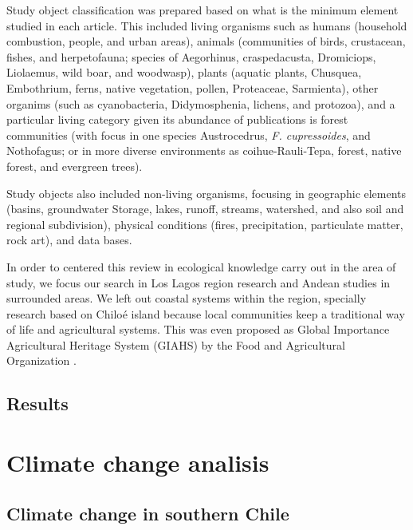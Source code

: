\documentclass[]{article}
\begin{document}
Study object classification was prepared based on what is the minimum element studied in each article. This included living organisms such as humans (household combustion, people, and urban areas), animals (communities of birds, crustacean, fishes, and herpetofauna; species of Aegorhinus, craspedacusta, Dromiciops, Liolaemus, wild boar, and woodwasp), plants (aquatic plants, Chusquea, Embothrium, ferns, native vegetation, pollen, Proteaceae, Sarmienta), other organims (such as cyanobacteria, Didymosphenia, lichens, and protozoa), and a particular living category given its abundance of publications is forest communities (with focus in one species Austrocedrus, \emph{F. cupressoides}, and Nothofagus; or in more diverse environments as coihue-Rauli-Tepa, forest, native forest, and evergreen trees).

Study objects also included non-living organisms, focusing in geographic elements (basins, groundwater Storage, lakes, runoff, streams, watershed, and also soil and regional subdivision), physical conditions (fires, precipitation, particulate matter, rock art), and data bases.

In order to centered this review in ecological knowledge carry out in the area of study, we focus our search in Los Lagos region research and Andean studies in surrounded areas. We left out coastal systems within the region, specially research based on Chiloé island because local communities keep a traditional way of life and agricultural systems. This was even proposed as Global Importance Agricultural Heritage System (GIAHS) by the Food and Agricultural Organization \citep{FAO2003Chiloe, FAO2008Chiloe}.

\hypertarget{results}{%
\subsection{Results}\label{results}}

\hypertarget{climate-change-analisis}{%
\section{Climate change analisis}\label{climate-change-analisis}}

\hypertarget{climate-change-in-southern-chile}{%
\subsection{Climate change in southern Chile}\label{climate-change-in-southern-chile}}
\end{document}
